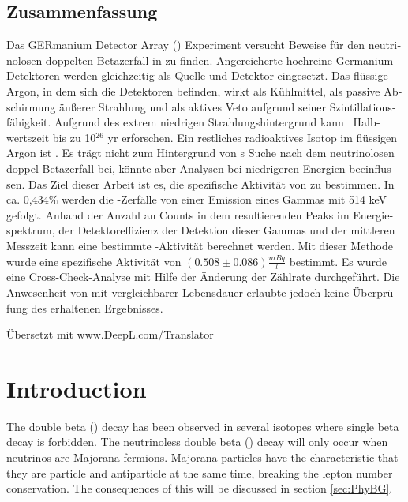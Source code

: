 \documentclass[encoding=utf8,british]{tumphthesis}
\begin{document}
\begin{otherlanguage}{ngerman}
\chapter*{Zusammenfassung}
Das GERmanium Detector Array (\gerda) Experiment versucht Beweise für den neutrinolosen doppelten Betazerfall in  zu finden.
Angereicherte hochreine Germanium-Detektoren werden gleichzeitig als Quelle und Detektor eingesetzt.
Das flüssige Argon, in dem sich die Detektoren befinden, wirkt als Kühlmittel, als passive Abschirmung äußerer Strahlung und als aktives Veto aufgrund seiner Szintillationsfähigkeit.
Aufgrund des extrem niedrigen Strahlungshintergrund kann \gerda\ Halbwertszeit bis zu 10$^{26}$ yr erforschen.
Ein restliches radioaktives Isotop im flüssigen Argon ist .
Es trägt nicht zum Hintergrund von \gerda s Suche nach dem neutrinolosen doppel Betazerfall bei, könnte aber Analysen bei niedrigeren Energien beeinflussen.
Das Ziel dieser Arbeit ist es, die spezifische Aktivität von  zu bestimmen.
In ca. 0,434$\%$ werden die \Kr-Zerfälle von einer Emission eines Gammas mit 514 keV gefolgt.
Anhand der Anzahl an Counts in dem resultierenden Peaks im Energiespektrum, der Detektoreffizienz der Detektion dieser Gammas und der mittleren Messzeit kann eine bestimmte \Kr-Aktivität berechnet werden.
Mit dieser Methode wurde eine spezifische Aktivität von $(0.508\pm0.086)\frac {\unit{mBq}} {\unit{l}}$ bestimmt.
Es wurde eine Cross-Check-Analyse mit Hilfe der Änderung der Zählrate durchgeführt.
Die Anwesenheit von  mit vergleichbarer Lebensdauer erlaubte jedoch keine Überprüfung des erhaltenen Ergebnisses.

Übersetzt mit www.DeepL.com/Translator
\end{otherlanguage}

\tableofcontents

\mainmatter

\chapter{Introduction}
\label{sec:intro}

The double beta (\twonu) decay has been observed in several isotopes where single beta decay is forbidden.
The neutrinoless double beta (\onbb) decay will only occur when neutrinos are Majorana fermions.
Majorana particles have the characteristic that they are particle and antiparticle at the same time, breaking the lepton number conservation.
The consequences of this will be discussed in  section \ref{sec:PhyBG}.
\\
\end{document}
